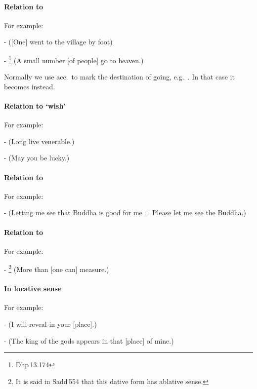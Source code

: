 \paragraph*{Relation to } For example:\par
-  ([One] went to the village by foot)\par
- \footnote{Dhp\,13.174} (A small number [of people] go to heaven.)\par
Normally we use acc.\ to mark the destination of going, e.g.\ . In that case it becomes  instead.

\paragraph*{Relation to `wish'} For example:\par
-  (Long live venerable.)\par
-  (May you be lucky.)\par

\paragraph*{Relation to } For example:\par
-  (Letting me see that Buddha is good for me = Please let me see the Buddha.)\par

\paragraph*{Relation to } For example:\par
- \footnote{It is said in Sadd\,554 that this dative form has ablative sense.} (More than [one can] measure.)\par

\paragraph*{In locative sense} For example:\par
-  (I will reveal in your [place].)\par
-  (The king of the gods appears in that [place] of mine.)\par


